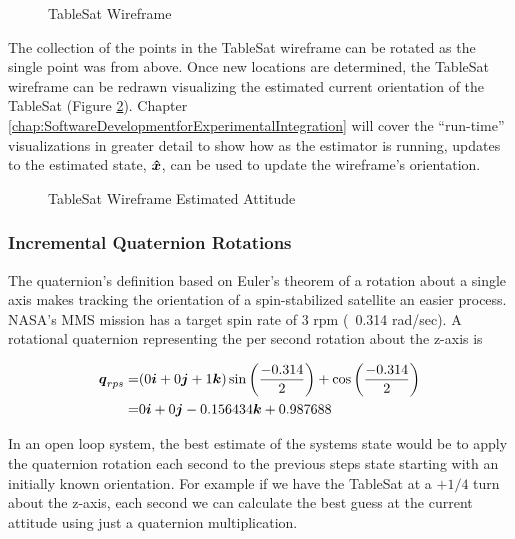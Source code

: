 \begin{figure}[H]
  \centerline{}
  \caption{TableSat Wireframe}
  \label{fig:TSatWireframe}
\end{figure}

The collection of the points in the TableSat wireframe can be rotated as the single point was from above.  Once new locations are determined, the TableSat wireframe can be redrawn visualizing the estimated current orientation of the TableSat (Figure \ref{fig:TSatWireframeEstimatedAttitude}).  Chapter \ref{chap:SoftwareDevelopmentforExperimentalIntegration} will cover the ``run-time'' visualizations in greater detail to show how as the estimator is running, updates to the estimated state, $\boldsymbol{\hat{x}}$, can be used to update the wireframe's orientation.

\begin{figure}[H]
  \centerline{}
  \caption{TableSat Wireframe Estimated Attitude}
  \label{fig:TSatWireframeEstimatedAttitude}
\end{figure}


\subsubsection{Incremental Quaternion Rotations}
\label{subsubsec:IncrementalQuaternionRotations}

The quaternion's definition based on Euler's theorem of a rotation about a single axis makes tracking the orientation of a spin-stabilized satellite an easier process.  NASA's MMS mission has a target spin rate of 3 rpm (~0.314 rad/sec).  A rotational quaternion representing the per second rotation about the z-axis is

\begin{equation}
  \begin{aligned}
    \boldsymbol{q}_{rps} = & ( 0\boldsymbol{i} + 0\boldsymbol{j} + 1\boldsymbol{k} ) \sin \left( \frac{-0.314}{2} \right) + \cos \left( \frac{-0.314}{2} \right) \\
    = & 0\boldsymbol{i} +0\boldsymbol{j} -0.156434\boldsymbol{k} + 0.987688
  \end{aligned}
\end{equation}

In an open loop system, the best estimate of the systems state would be to apply the quaternion rotation each second to the previous steps state starting with an initially known orientation.  For example if we have the TableSat at a $+1/4$ turn about the z-axis, each second we can calculate the best guess at the current attitude using just a quaternion multiplication.

